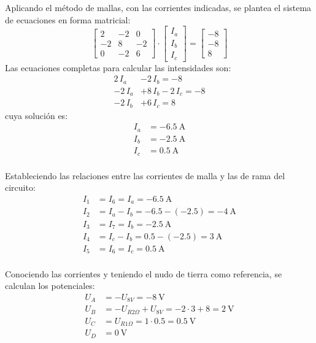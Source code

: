 Aplicando el método de mallas, con las corrientes indicadas, se
plantea el sistema de ecuaciones en forma matricial:
\begin{equation*}
  \begin{bmatrix}
    2 & -2 & 0 \\
    -2 & 8 & -2 \\
    0 & -2 & 6
  \end{bmatrix} \cdot
  \begin{bmatrix}
    I_a\\
    I_b\\
    I_c
  \end{bmatrix} = %
  \begin{bmatrix}
    -8 \\
    -8\\
    8
  \end{bmatrix}
\end{equation*}
Las ecuaciones completas para calcular las intensidades son:
\begin{align*}
  2\,I_a&-2\,I_b = -8\\
  -2\,I_a&+8\,I_b-2\,I_c = -8\\
  -2\,I_b&+ 6\,I_c = 8
\end{align*}
cuya solución es:
\begin{align*}
  I_a&=\qty{-6.5}{\ampere}\\
  I_b&=\qty{-2.5}{\ampere}\\
  I_c&=\qty{0.5}{\ampere}\\
\end{align*}

Estableciendo las relaciones entre las corrientes de malla y las de
rama del circuito:
\begin{align*}
  I_1&=I_6=I_a=\qty{-6.5}{\ampere}\\
  I_2&=I_a-I_b=-6.5-(-2.5)=\qty{-4}{\ampere}\\
  I_3&=I_7=I_b=\qty{-2.5}{\ampere}\\
  I_4&=I_c-I_b=0.5-(-2.5)=\qty{3}{\ampere}\\
  I_5&=I_6=I_c=\qty{0.5}{\ampere}\\
\end{align*}

Conociendo las corrientes y teniendo el nudo de tierra como
referencia, se calculan los potenciales:
\begin{align*}
  U_A&=-U_{8V}=\qty{-8}{\volt}\\
  U_B&=-U_{R2\Omega}+U_{8V}=-2\cdot 3+8=\qty{2}{\volt}\\
  U_C&=U_{R1\Omega}=1\cdot 0.5=\qty{0.5}{\volt}\\
  U_D&=\qty{0}{\volt}
\end{align*}

